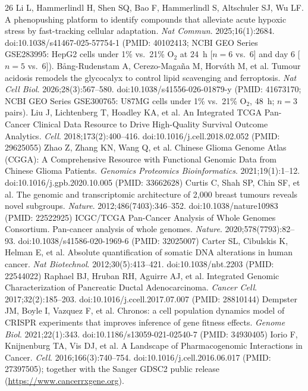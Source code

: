 \documentclass[11pt]{article}
\begin{document}
\begin{thebibliography}{26}
 Li L, Hammerlindl H, Shen SQ, Bao F, Hammerlindl S, Altschuler SJ, Wu LF. A phenopushing platform to identify compounds that alleviate acute hypoxic stress by fast-tracking cellular adaptation. \textit{Nat Commun}. 2025;16(1):2684. doi:10.1038/s41467-025-57754-1 (PMID: 40102413; NCBI GEO Series GSE283995: HepG2 cells under 1\% vs.\ 21\% $\text{O}_2$ at 24~h [$n = 6$ vs.\ $6$] and day 6 [$n = 5$ vs.\ $6$]).
 B\aa ng-Rudenstam A, Cerezo-Maga\~na M, Horv\'ath M, et al. Tumour acidosis remodels the glycocalyx to control lipid scavenging and ferroptosis. \textit{Nat Cell Biol}. 2026;28(3):567--580. doi:10.1038/s41556-026-01879-y (PMID: 41673170; NCBI GEO Series GSE300765: U87MG cells under 1\% vs.\ 21\% $\text{O}_2$, 48~h; $n = 3$ pairs).
 Liu J, Lichtenberg T, Hoadley KA, et al. An Integrated TCGA Pan-Cancer Clinical Data Resource to Drive High-Quality Survival Outcome Analytics. \textit{Cell}. 2018;173(2):400--416. doi:10.1016/j.cell.2018.02.052 (PMID: 29625055)
 Zhao Z, Zhang KN, Wang Q, et al. Chinese Glioma Genome Atlas (CGGA): A Comprehensive Resource with Functional Genomic Data from Chinese Glioma Patients. \textit{Genomics Proteomics Bioinformatics}. 2021;19(1):1--12. doi:10.1016/j.gpb.2020.10.005 (PMID: 33662628)
 Curtis C, Shah SP, Chin SF, et al. The genomic and transcriptomic architecture of 2,000 breast tumours reveals novel subgroups. \textit{Nature}. 2012;486(7403):346--352. doi:10.1038/nature10983 (PMID: 22522925)
 ICGC/TCGA Pan-Cancer Analysis of Whole Genomes Consortium. Pan-cancer analysis of whole genomes. \textit{Nature}. 2020;578(7793):82--93. doi:10.1038/s41586-020-1969-6 (PMID: 32025007)
 Carter SL, Cibulskis K, Helman E, et al. Absolute quantification of somatic DNA alterations in human cancer. \textit{Nat Biotechnol}. 2012;30(5):413--421. doi:10.1038/nbt.2203 (PMID: 22544022)
 Raphael BJ, Hruban RH, Aguirre AJ, et al. Integrated Genomic Characterization of Pancreatic Ductal Adenocarcinoma. \textit{Cancer Cell}. 2017;32(2):185--203. doi:10.1016/j.ccell.2017.07.007 (PMID: 28810144)
 Dempster JM, Boyle I, Vazquez F, et al. Chronos: a cell population dynamics model of CRISPR experiments that improves inference of gene fitness effects. \textit{Genome Biol}. 2021;22(1):343. doi:10.1186/s13059-021-02540-7 (PMID: 34930405)
 Iorio F, Knijnenburg TA, Vis DJ, et al. A Landscape of Pharmacogenomic Interactions in Cancer. \textit{Cell}. 2016;166(3):740--754. doi:10.1016/j.cell.2016.06.017 (PMID: 27397505); together with the Sanger GDSC2 public release (\url{https://www.cancerrxgene.org}).

\end{thebibliography}
\end{document}
